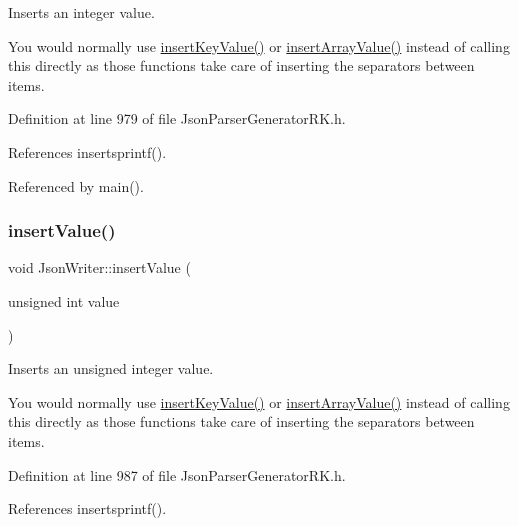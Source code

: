 Inserts an integer value. 

You would normally use \hyperlink{class_json_writer_ac2de627389b59ce2c8ed95e10ea213bf}{insert\+Key\+Value()} or \hyperlink{class_json_writer_a8b4dc6726b66b4f277c7674e60c8a057}{insert\+Array\+Value()} instead of calling this directly as those functions take care of inserting the separators between items. 

Definition at line 979 of file Json\+Parser\+Generator\+R\+K.\+h.



References insertsprintf().



Referenced by main().

\mbox{\label{class_json_writer_a296c63529260115c9fa0aced54960903}} 
\subsubsection{\texorpdfstring{insert\+Value()}{insertValue()}\hspace{0.1cm}{\footnotesize\ttfamily [3/9]}}
{\footnotesize\ttfamily void Json\+Writer\+::insert\+Value (\begin{DoxyParamCaption}\item[{unsigned int}]{value }\end{DoxyParamCaption})\hspace{0.3cm}{\ttfamily [inline]}}



Inserts an unsigned integer value. 

You would normally use \hyperlink{class_json_writer_ac2de627389b59ce2c8ed95e10ea213bf}{insert\+Key\+Value()} or \hyperlink{class_json_writer_a8b4dc6726b66b4f277c7674e60c8a057}{insert\+Array\+Value()} instead of calling this directly as those functions take care of inserting the separators between items. 

Definition at line 987 of file Json\+Parser\+Generator\+R\+K.\+h.



References insertsprintf().

\mbox{\label{class_json_writer_a069e3c244a8a320eaa9dd5625874d98e}} 
